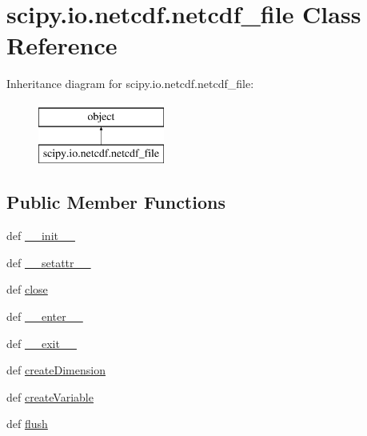 \hypertarget{classscipy_1_1io_1_1netcdf_1_1netcdf__file}{}\section{scipy.\+io.\+netcdf.\+netcdf\+\_\+file Class Reference}
\label{classscipy_1_1io_1_1netcdf_1_1netcdf__file}
Inheritance diagram for scipy.\+io.\+netcdf.\+netcdf\+\_\+file\+:\begin{figure}[H]
\begin{center}
\leavevmode
\includegraphics[height=2.000000cm]{classscipy_1_1io_1_1netcdf_1_1netcdf__file}
\end{center}
\end{figure}
\subsection*{Public Member Functions}
\begin{DoxyCompactItemize}
\item 
def \hyperlink{classscipy_1_1io_1_1netcdf_1_1netcdf__file_ab163314326e36e86dd999697200e81c0}{\+\_\+\+\_\+init\+\_\+\+\_\+}
\item 
def \hyperlink{classscipy_1_1io_1_1netcdf_1_1netcdf__file_acbdae427e5a55644232a555ac271b7cf}{\+\_\+\+\_\+setattr\+\_\+\+\_\+}
\item 
def \hyperlink{classscipy_1_1io_1_1netcdf_1_1netcdf__file_aa86ba264e8d28b0108ada6a0b06c9a26}{close}
\item 
def \hyperlink{classscipy_1_1io_1_1netcdf_1_1netcdf__file_a21e05266d6263eeb6fe40bb37f7cf895}{\+\_\+\+\_\+enter\+\_\+\+\_\+}
\item 
def \hyperlink{classscipy_1_1io_1_1netcdf_1_1netcdf__file_aa7fcaf5f5871ad79e564476bacf5fae3}{\+\_\+\+\_\+exit\+\_\+\+\_\+}
\item 
def \hyperlink{classscipy_1_1io_1_1netcdf_1_1netcdf__file_a2c8cbb81ac3f4c3b458fc49a850eea4c}{create\+Dimension}
\item 
def \hyperlink{classscipy_1_1io_1_1netcdf_1_1netcdf__file_afa5e84ef68d02462124965548d29b130}{create\+Variable}
\item 
def \hyperlink{classscipy_1_1io_1_1netcdf_1_1netcdf__file_a8cf81ee24b252c20be8f13dbedb707e7}{flush}
\end{DoxyCompactItemize}
